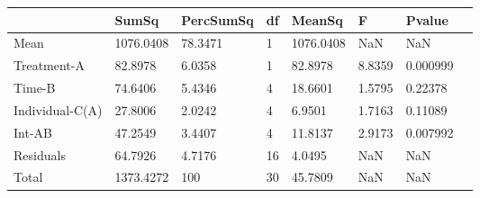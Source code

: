 \begin{table} 
\begin{tabular}{llllllll}
 & SumSq & PercSumSq & df & MeanSq & F & Pvalue \\ 
 \hline 
Mean & 1076.0408 & 78.3471 & 1 & 1076.0408 & NaN & NaN \\ 
Treatment-A & 82.8978 & 6.0358 & 1 & 82.8978 & 8.8359 & 0.000999 \\ 
Time-B & 74.6406 & 5.4346 & 4 & 18.6601 & 1.5795 & 0.22378 \\ 
Individual-C(A) & 27.8006 & 2.0242 & 4 & 6.9501 & 1.7163 & 0.11089 \\ 
Int-AB & 47.2549 & 3.4407 & 4 & 11.8137 & 2.9173 & 0.007992 \\ 
Residuals & 64.7926 & 4.7176 & 16 & 4.0495 & NaN & NaN \\ 
Total & 1373.4272 & 100 & 30 & 45.7809 & NaN & NaN \\ 
\end{tabular} 
\end{table} 
